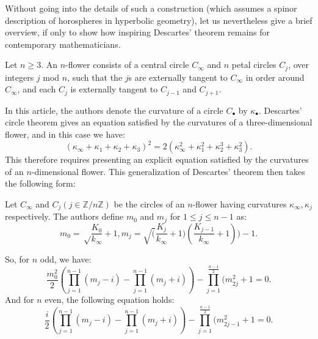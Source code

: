 \documentclass[12pt]{article}
\theoremstyle{définition}
\theoremstyle{remark}
\theoremstyle{plain}
\theoremstyle{plain}
\begin{document}
Without going into the details of such a construction (which assumes a spinor description of horospheres in hyperbolic geometry), let us nevertheless give a brief overview, if only to show how inspiring Descartes' theorem remains for contemporary mathematicians.

Let $n \ge 3$. An $n$-flower consists of a central circle $C_\infty$ and $n$ petal circles $C_j$, over integers $j$ mod $n$, such that the $j$s are externally tangent to $C_\infty$ in order around $C_\infty$, and each $C_j$ is externally tangent to $C_{j-1}$ and $C_{j+1}$.

In this article, the authors denote the curvature of a circle $C_\bullet$ by $\kappa_\bullet$. Descartes' circle theorem gives an equation satisfied by the curvatures of a three-dimensional flower, and in this case we have:
\begin{equation}
(\kappa_\infty + \kappa_1 + \kappa_2 + \kappa_3)^2 = 2(\kappa_\infty^2 + \kappa_1^2 + \kappa_2^3 + \kappa_3^2).
\end{equation}
This therefore requires presenting an explicit equation satisfied by the curvatures of an $n$-dimensional flower. This generalization of Descartes' theorem then takes the following form:

Let $C_\infty$ and $C_j (j \in \mathbb{Z}/n\mathbb{Z})$ be the circles of an $n$-flower having curvatures $\kappa_\infty, \kappa_j$ respectively. The authors define $m_0$ and $m_j$ for $1 \leq j \leq n - 1$ as:
\begin{equation}
m_0 = \sqrt\frac{K_0}{k_\infty}+1, m_j = \sqrt(\frac{K_j}{k_\infty}+1)(\frac{K_{j-1}}{k_\infty}+1))-1. \end{equation}

So, for $n$ odd, we have:
\begin{equation}
\frac{m_0^2}{2}(\prod_{j=1}^{n-1} (m_j-i) - \prod_{j=1}^{n-1} (m_j+i))-\prod_{j=1}^{\frac{n-1}{2}}(m^2_{2j}+1 =0.
\end{equation}
And for $n$ even, the following equation holds:
\begin{equation}
\frac{i}{2}(\prod_{j=1}^{n-1} (m_j-i) - \prod_{j=1}^{n-1} (m_j+i))-\prod_{j=1}^{\frac{n-1}{2}}(m^2_{2j-1}+1 =0.
\end{equation}
\end{document}
